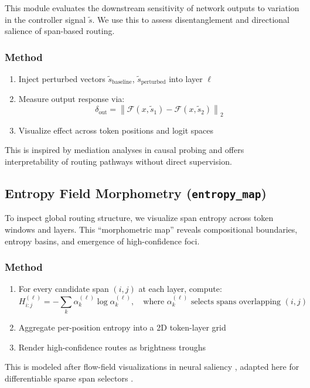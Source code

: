 This module evaluates the downstream sensitivity of network outputs to variation in the controller signal \( \tilde{s} \). We use this to assess disentanglement and directional salience of span-based routing.

\subsubsection*{Method}

\begin{enumerate}[leftmargin=1.5em]
  \item Inject perturbed vectors \( \tilde{s}_\text{baseline} \), \( \tilde{s}_\text{perturbed} \) into layer \( \ell \)
  \item Measure output response via:
  \begin{equation}
    \delta_{\text{out}} = \left\| \mathcal{F}(x, \tilde{s}_1) - \mathcal{F}(x, \tilde{s}_2) \right\|_2
    \label{eq:controller_effect}
  \end{equation}
  \item Visualize effect across token positions and logit spaces
\end{enumerate}

This is inspired by mediation analyses in causal probing \cite{vig2020investigating, belinkov2019analyzing} and offers interpretability of routing pathways without direct supervision.

\subsection{Entropy Field Morphometry (\texttt{entropy\_map})}
\label{sec:vis-entropy}

To inspect global routing structure, we visualize span entropy across token windows and layers. This “morphometric map” reveals compositional boundaries, entropy basins, and emergence of high-confidence foci.

\subsubsection*{Method}

\begin{enumerate}[leftmargin=1.5em]
  \item For every candidate span \( (i,j) \) at each layer, compute:
  \begin{equation}
    H_{i:j}^{(\ell)} = -\sum_k \alpha_k^{(\ell)} \log \alpha_k^{(\ell)}, \quad \text{where } \alpha_k^{(\ell)} \text{ selects spans overlapping } (i, j)
    \label{eq:entropy_local}
  \end{equation}
  \item Aggregate per-position entropy into a 2D token-layer grid
  \item Render high-confidence routes as brightness troughs
\end{enumerate}

This is modeled after flow-field visualizations in neural saliency \cite{olah2018building}, adapted here for differentiable sparse span selectors \cite{pereyra2017regularizing, liu2024structured}.
